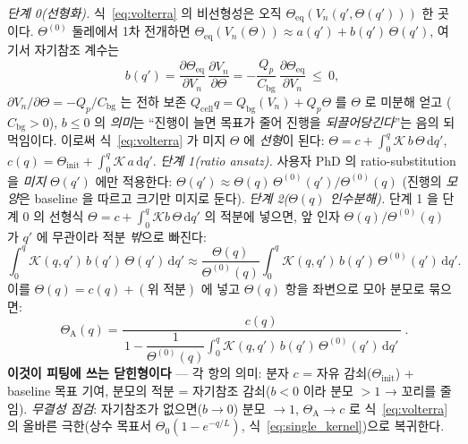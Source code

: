 \documentclass[11pt,a4paper]{article}
\newcommand{\dd}{\mathrm{d}}
\newcommand{\eq}{\mathrm{eq}}
\newcommand{\bg}{\mathrm{bg}}
\newcommand{\cell}{\mathrm{cell}}
\begin{document}
\emph{단계 0(선형화).} 식~\eqref{eq:volterra} 의 비선형성은 오직 $\Theta_\eq(V_n(q',\Theta(q')))$ 한 곳이다.
$\Theta^{(0)}$ 둘레에서 1차 전개하면 $\Theta_\eq(V_n(\Theta))\approx a(q')+b(q')\,\Theta(q')$, 여기서 자기참조 계수는
\begin{equation}
b(q')=\frac{\partial\Theta_\eq}{\partial V_n}\,\frac{\partial V_n}{\partial\Theta}
=-\frac{Q_p}{C_\bg}\,\frac{\partial\Theta_\eq}{\partial V_n}\ \le\ 0,
\label{eq:selfcoupling}
\end{equation}
$\partial V_n/\partial\Theta=-Q_p/C_\bg$ 는 전하 보존 $Q_\cell q=Q_\bg(V_n)+Q_p\Theta$ 를 $\Theta$ 로 미분해 얻고
($C_\bg>0$), $b\le0$ 의 \emph{의미}는 ``진행이 늘면 목표가 줄어 진행을 \emph{되끌어당긴다}''는 음의 되먹임이다.
이로써 식~\eqref{eq:volterra} 가 미지 $\Theta$ 에 \emph{선형}이 된다: $\Theta=c+\int_0^q\mathcal K\,b\,\Theta\,\dd q'$,
$c(q)=\Theta_\mathrm{init}+\int_0^q\mathcal K\,a\,\dd q'$.
\emph{단계 1(ratio ansatz).} 사용자 PhD \cite{lee2011,son2013} 의 ratio-substitution 을 \emph{미지} $\Theta(q')$
에만 적용한다: $\Theta(q')\approx\Theta(q)\,\Theta^{(0)}(q')/\Theta^{(0)}(q)$ (진행의 \emph{모양}은 baseline 을
따르고 크기만 미지로 둔다).
\emph{단계 2($\Theta(q)$ 인수분해).} 단계 1 을 단계 0 의 선형식 $\Theta=c+\int_0^q\mathcal K b\,\Theta\,\dd q'$ 의
적분에 넣으면, 앞 인자 $\Theta(q)/\Theta^{(0)}(q)$ 가 $q'$ 에 무관이라 적분 \emph{밖}으로 빠진다:
\begin{equation*}
\int_0^q\mathcal K(q,q')\,b(q')\,\Theta(q')\,\dd q'\approx\frac{\Theta(q)}{\Theta^{(0)}(q)}\int_0^q\mathcal K(q,q')\,b(q')\,\Theta^{(0)}(q')\,\dd q'.
\end{equation*}
이를 $\Theta(q)=c(q)+(\text{위 적분})$ 에 넣고 $\Theta(q)$ 항을 좌변으로 모아 분모로 묶으면:
\begin{equation}
\boxed{\;\Theta_\mathrm A(q)=\frac{c(q)}{\,1-\dfrac{1}{\Theta^{(0)}(q)}\displaystyle\int_0^q\mathcal K(q,q')\,b(q')\,\Theta^{(0)}(q')\,\dd q'\,}\;.}
\label{eq:closed}
\end{equation}
\textbf{이것이 피팅에 쓰는 닫힌형이다} — 각 항의 의미: 분자 $c$ = 자유 감쇠($\Theta_\mathrm{init}$) + baseline
목표 기여, 분모의 적분 = 자기참조 감쇠($b<0$ 이라 분모 $>1$ → 꼬리를 줄임). \emph{무결성 점검}: 자기참조가
없으면($b\to0$) 분모 $\to1$, $\Theta_\mathrm A\to c$ 로 식~\eqref{eq:volterra} 의 올바른 극한(상수 목표서
$\Theta_0(1-e^{-q/L})$, 식~\eqref{eq:single_kernel})으로 복귀한다.
\end{document}
